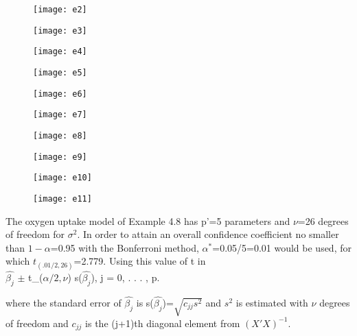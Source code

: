 \documentclass[letterpaper,11pt]{article}
\begin{document}
{	\begin{figure}[htbp]
	\centering
	\texttt{[image: e2]}
	\end{figure}
	
	\begin{figure}[htbp]
	\centering
	\texttt{[image: e3]}
	\end{figure}
	
	\begin{figure}[htbp]
	\centering
	\texttt{[image: e4]}
	\end{figure}
	
	\begin{figure}[htbp]
	\centering
	\texttt{[image: e5]}
	\end{figure}
	
	\begin{figure}[htbp]
	\centering
	\texttt{[image: e6]}
	\end{figure}
	
	\begin{figure}[htbp]
	\centering
	\texttt{[image: e7]}
	\end{figure}
	
	\begin{figure}[htbp]
	\centering
	\texttt{[image: e8]}
	\end{figure}
	
	\begin{figure}[htbp]
	\centering
	\texttt{[image: e9]}
	\end{figure}
	
	\begin{figure}[htbp]
	\centering
	\texttt{[image: e10]}
	\end{figure}

	\begin{figure}[htbp]
	\centering
	\texttt{[image: e11]}
	\end{figure}

The oxygen uptake model of Example 4.8 has p'=5 parameters and $\nu$=26 degrees of freedom for $\sigma^{2}$. In order to attain 
an overall confidence coefficient no smaller than $1-\alpha$=0.95 with the Bonferroni method, $\alpha^{*}$=0.05/5=0.01 would be used, 
for which $t_{(.01/2,26)}$=2.779. Using this value of t in 
\\
$\hat{\beta_{j}}$ $\pm$ t_{($\alpha /2 , \nu$)}  s($\hat{\beta_{j}}$), j = 0, . . . , p.

where the standard error of $\hat{\beta_{j}}$ is s($\hat{\beta_{j}}$)=$\sqrt{c_{jj} s^{2}}$ and $s^{2}$ is estimated with $\nu$ degrees of 
freedom and $c_{jj}$ is the (j+1)th diagonal element from $(X' X)^{-1}$.

}
\end{document}

